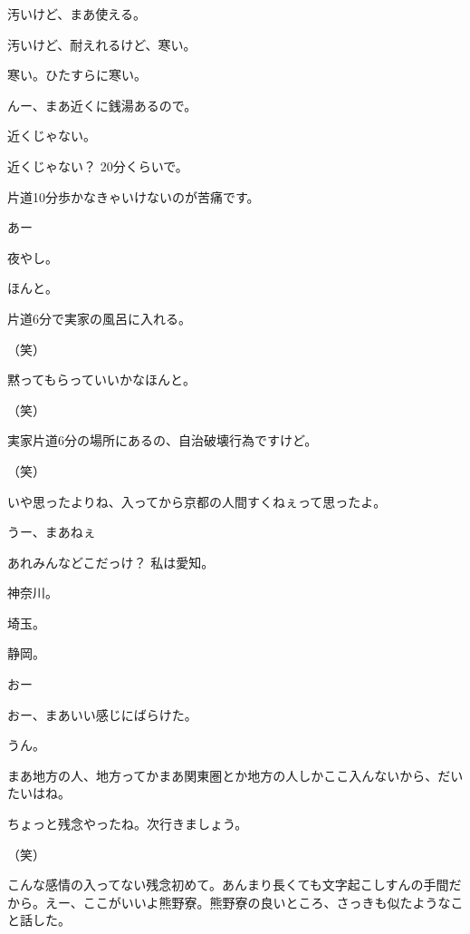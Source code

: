 \begin{multicols}{3}
{        汚いけど、まあ使える。

        汚いけど、耐えれるけど、寒い。

        寒い。ひたすらに寒い。

        んー、まあ近くに銭湯あるので。

        近くじゃない。

        近くじゃない？ 20分くらいで。

        片道10分歩かなきゃいけないのが苦痛です。

        あー

        夜やし。

        ほんと。

        片道6分で実家の風呂に入れる。

        （笑）

        黙ってもらっていいかなほんと。

        （笑）

        実家片道6分の場所にあるの、自治破壊行為ですけど。

        （笑）

        いや思ったよりね、入ってから京都の人間すくねぇって思ったよ。

        うー、まあねぇ

        あれみんなどこだっけ？ 私は愛知。

        神奈川。

        埼玉。

        静岡。

        おー

        おー、まあいい感じにばらけた。

        うん。

        まあ地方の人、地方ってかまあ関東圏とか地方の人しかここ入んないから、だいたいはね。

        ちょっと残念やったね。次行きましょう。

        （笑）

        こんな感情の入ってない残念初めて。あんまり長くても文字起こしすんの手間だから。えー、ここがいいよ熊野寮。熊野寮の良いところ、さっきも似たようなこと話した。

}
\end{multicols}
